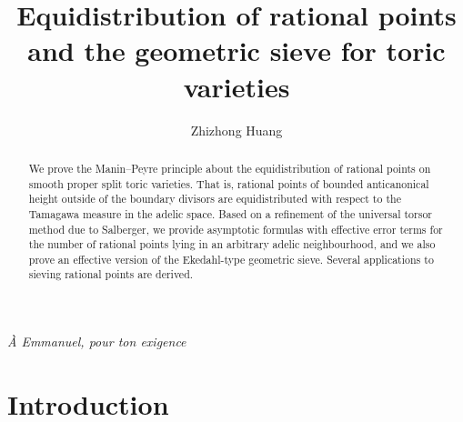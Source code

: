 \documentclass[11pt,letterpaper]{amsart}
\title[Equidistribution and geometric sieve for toric varieties]
{Equidistribution of rational points and the geometric sieve for toric varieties}
\author{Zhizhong Huang}
\theoremstyle{plain}
\numberwithin{equation}{section}
\theoremstyle{definition}
\theoremstyle{remark}
\begin{document}
			\begin{abstract}
			We prove the Manin--Peyre principle about the equidistribution of rational points on smooth proper split toric varieties. That is, rational points of bounded anticanonical height outside of the boundary divisors are equidistributed with respect to the Tamagawa measure in the adelic space. Based on a refinement of the universal torsor method due to Salberger, we provide asymptotic formulas with effective error terms for the number of rational points lying in an arbitrary adelic neighbourhood, and we also prove  an effective version of the Ekedahl-type geometric sieve. Several applications to sieving rational points  are derived. 
		\end{abstract}
						\maketitle	
								\begin{flushright}
							\textit{À Emmanuel, pour ton exigence}
						\end{flushright}					
	\tableofcontents

\section{Introduction}
\end{document}
